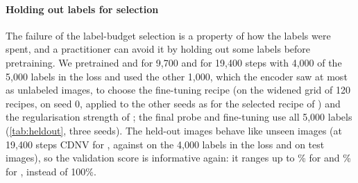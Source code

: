 \paragraph{Holding out labels for selection}
The failure of the label-budget selection is a property of how the labels were spent, and a practitioner can
avoid it by holding out some labels before pretraining. We pretrained \supcon and \union for 9,700 and for 19,400
steps with 4,000 of the 5,000 labels in the loss and used the other 1,000, which the encoder saw at most as unlabeled
images, to choose the fine-tuning recipe (on the widened grid of 120 recipes, on seed 0, applied to the other seeds as
for the selected recipe of \simclr) and the regularisation strength of \lpfive; the final probe and fine-tuning
use all 5,000 labels (\cref{tab:heldout}, three seeds). The held-out
images behave like unseen images (at 19,400 steps CDNV  for \supcon, against
 on the 4,000 labels in the loss and 
on test images), so the validation score is informative again: it ranges up to
\% for \supcon and \% for \union, instead of
100\%.

